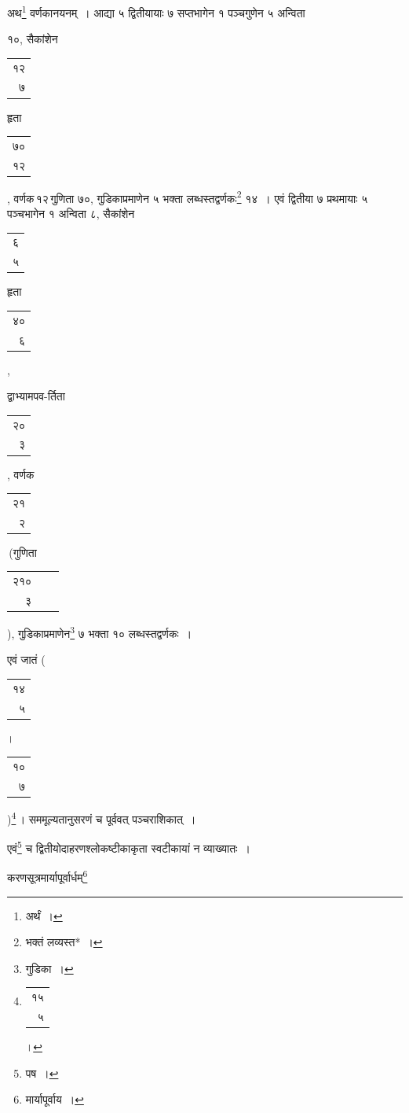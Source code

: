 \documentclass[10pt, openany]{book}
\begin{document}
{{{अथ\renewcommand{\thefootnote}{\s ६}\footnote{\s अर्थं~।}  वर्णकानयनम्~। आद्या ५ द्वितीयायाः ७ सप्तभागेन १ पञ्चगुणेन ५
अन्विता}
{१०, सैकांशेन\begin{tabular}{r}१२\\ ७\end{tabular}हृता\begin{tabular}{r}७०\\ १२\end{tabular}, वर्णक\textendash \,१२\textendash \,गुणिता ७०, गुडिकाप्रमाणेन ५
भक्ता लब्धस्तद्वर्णकः\renewcommand{\thefootnote}{\s ७}\footnote{\s भक्तं लव्यस्त*~।} १४~। एवं द्वितीया ७ प्रथमायाः ५ पञ्चभागेन १ अन्विता ८, सैकांशेन\begin{tabular}{r}६\\ ५\end{tabular}हृता\begin{tabular}{r}४०\\ ६\end{tabular},}
{द्वाभ्यामपव-र्तिता\begin{tabular}{r}२०\\ ३\end{tabular}, वर्णक\textendash\,\begin{tabular}{r}२१\\ २\end{tabular}\textendash\,\bigg(गुणिता\begin{tabular}{rll}२१०\\ ३\end{tabular}\bigg),
गुडिकाप्रमाणेन\renewcommand{\thefootnote}{\s ८}\footnote{\s गुडिका~।}  ७ भक्ता १० लब्धस्तद्वर्णकः~।} 
{एवं जातं \bigg(\begin{tabular}{r}१४\\५\end{tabular}।\begin{tabular}{r}१०\\ ७\end{tabular}\bigg)\renewcommand{\thefootnote}{\s ९}\footnote{\s \begin{tabular}{r}१५\\ ५\end{tabular}।}\,। सममूल्यतानुसरणं च पूर्ववत्
पञ्चराशिकात्~।}
\vspace{2mm}

{एवं\renewcommand{\thefootnote}{\s १०}\footnote{\s पष~।}  च द्वितीयोदाहरणश्लोकष्टीकाकृता स्वटीकायां न व्याख्यातः~।}
\vspace{3mm}

{करणसूत्रमार्यापूर्वार्धम्\renewcommand{\thefootnote}{\s ११}\footnote{\s मार्यापूर्वाय~।}\textemdash}

}}
\end{document}
